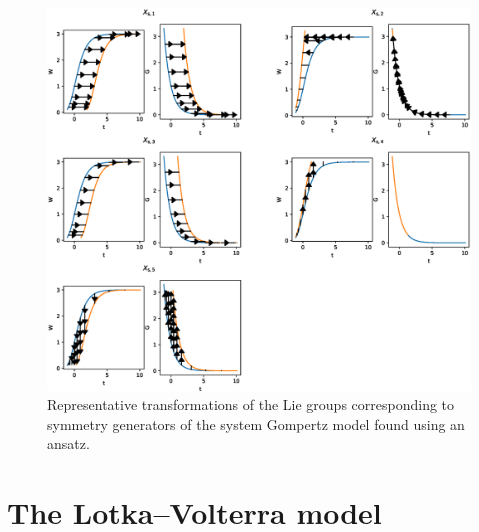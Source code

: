 \begin{figure}
  \centering
  \includegraphics[width=.96\textwidth]{images/gompertz-system-ansatz}
  \caption{Representative transformations of the Lie groups corresponding to symmetry generators of the system Gompertz model found using an ansatz.}
  \label{fig:gompertz-system-ansatz}
\end{figure}

\section{The Lotka--Volterra model}

